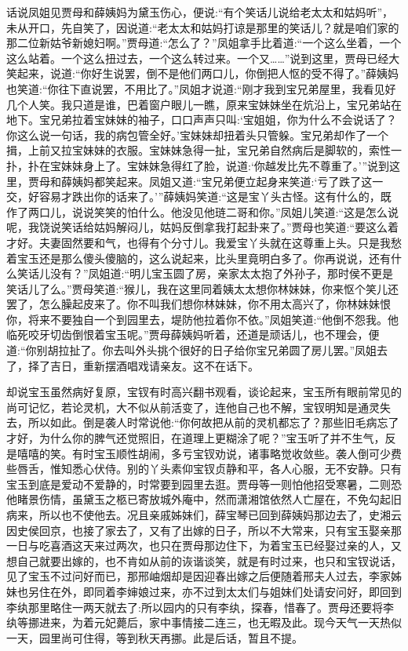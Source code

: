 


\begin{parag}
    话说凤姐见贾母和薛姨妈为黛玉伤心，便说:“有个笑话儿说给老太太和姑妈听”，未从开口，先自笑了，因说道:“老太太和姑妈打谅是那里的笑话儿？就是咱们家的那二位新姑爷新媳妇啊。”贾母道:“怎么了？”凤姐拿手比着道:“一个这么坐着，一个这么站着。一个这么扭过去，一个这么转过来。一个又……”说到这里，贾母已经大笑起来，说道:“你好生说罢，倒不是他们两口儿，你倒把人怄的受不得了。”薛姨妈也笑道:“你往下直说罢，不用比了。”凤姐才说道:“刚才我到宝兄弟屋里，我看见好几个人笑。我只道是谁，巴着窗户眼儿一瞧，原来宝妹妹坐在炕沿上，宝兄弟站在地下。宝兄弟拉着宝妹妹的袖子，口口声声只叫:‘宝姐姐，你为什么不会说话了？你这么说一句话，我的病包管全好。’宝妹妹却扭着头只管躲。宝兄弟却作了一个揖，上前又拉宝妹妹的衣服。宝妹妹急得一扯，宝兄弟自然病后是脚软的，索性一扑，扑在宝妹妹身上了。宝妹妹急得红了脸，说道:‘你越发比先不尊重了。’”说到这里，贾母和薛姨妈都笑起来。凤姐又道:“宝兄弟便立起身来笑道:‘亏了跌了这一交，好容易才跌出你的话来了。’”薛姨妈笑道:“这是宝丫头古怪。这有什么的，既作了两口儿，说说笑笑的怕什么。他没见他琏二哥和你。”凤姐儿笑道:“这是怎么说呢，我饶说笑话给姑妈解闷儿，姑妈反倒拿我打起卦来了。”贾母也笑道:“要这么着才好。夫妻固然要和气，也得有个分寸儿。我爱宝丫头就在这尊重上头。只是我愁着宝玉还是那么傻头傻脑的，这么说起来，比头里竟明白多了。你再说说，还有什么笑话儿没有？”凤姐道:“明儿宝玉圆了房，亲家太太抱了外孙子，那时侯不更是笑话儿了么。”贾母笑道:“猴儿，我在这里同着姨太太想你林妹妹，你来怄个笑儿还罢了，怎么臊起皮来了。你不叫我们想你林妹妹，你不用太高兴了，你林妹妹恨你，将来不要独自一个到园里去，堤防他拉着你不依。”凤姐笑道:“他倒不怨我。他临死咬牙切齿倒恨着宝玉呢。”贾母薛姨妈听着，还道是顽话儿，也不理会，便道:“你别胡拉扯了。你去叫外头挑个很好的日子给你宝兄弟圆了房儿罢。”凤姐去了，择了吉日，重新摆酒唱戏请亲友。这不在话下。
\end{parag}


\begin{parag}
    却说宝玉虽然病好复原，宝钗有时高兴翻书观看，谈论起来，宝玉所有眼前常见的尚可记忆，若论灵机，大不似从前活变了，连他自己也不解，宝钗明知是通灵失去，所以如此。倒是袭人时常说他:“你何故把从前的灵机都忘了？那些旧毛病忘了才好，为什么你的脾气还觉照旧，在道理上更糊涂了呢？”宝玉听了并不生气，反是嘻嘻的笑。有时宝玉顺性胡闹，多亏宝钗劝说，诸事略觉收敛些。袭人倒可少费些唇舌，惟知悉心伏侍。别的丫头素仰宝钗贞静和平，各人心服，无不安静。只有宝玉到底是爱动不爱静的，时常要到园里去逛。贾母等一则怕他招受寒暑，二则恐他睹景伤情，虽黛玉之柩已寄放城外庵中，然而潇湘馆依然人亡屋在，不免勾起旧病来，所以也不使他去。况且亲戚姊妹们，薛宝琴已回到薛姨妈那边去了，史湘云因史侯回京，也接了家去了，又有了出嫁的日子，所以不大常来，只有宝玉娶亲那一日与吃喜酒这天来过两次，也只在贾母那边住下，为着宝玉已经娶过亲的人，又想自己就要出嫁的，也不肯如从前的诙谐谈笑，就是有时过来，也只和宝钗说话，见了宝玉不过问好而已，那邢岫烟却是因迎春出嫁之后便随着邢夫人过去，李家姊妹也另住在外，即同着李婶娘过来，亦不过到太太们与姐妹们处请安问好，即回到李纨那里略住一两天就去了:所以园内的只有李纨，探春，惜春了。贾母还要将李纨等挪进来，为着元妃薨后，家中事情接二连三，也无暇及此。现今天气一天热似一天，园里尚可住得，等到秋天再挪。此是后话，暂且不提。
\end{parag}


